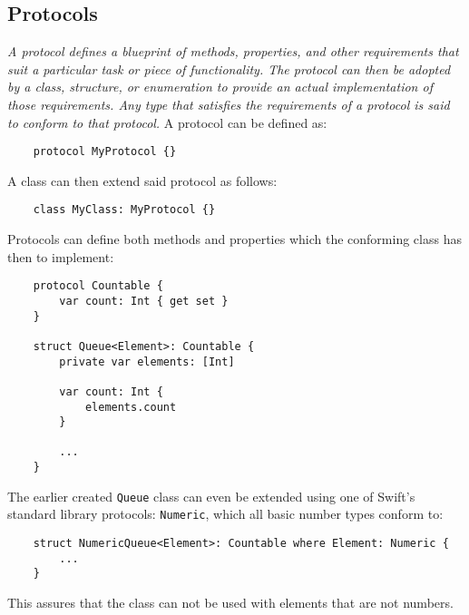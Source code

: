 \subsection{Protocols}
\textit{A protocol defines a blueprint of methods, properties, and other requirements that suit a particular task or piece of functionality. The protocol can then be adopted by a class, structure, or enumeration to provide an actual implementation of those requirements. Any type that satisfies the requirements of a protocol is said to conform to that protocol.} \cite{swift-book}
A protocol can be defined as:
\begin{verbatim}
    protocol MyProtocol {}
\end{verbatim}
A class can then extend said protocol as follows:
\begin{verbatim}
    class MyClass: MyProtocol {}
\end{verbatim}
Protocols can define both methods and properties which the conforming class has then to implement:
\begin{verbatim}
    protocol Countable {
        var count: Int { get set }
    }
    
    struct Queue<Element>: Countable {
        private var elements: [Int]

        var count: Int {
            elements.count
        }

        ...
    }
\end{verbatim}
The earlier created \lstinline{Queue} class can even be extended using one of Swift's standard library protocols: \lstinline{Numeric}, which all basic number types conform to:
\begin{verbatim}
    struct NumericQueue<Element>: Countable where Element: Numeric {
        ...
    }
\end{verbatim}
This assures that the class can not be used with elements that are not numbers.

